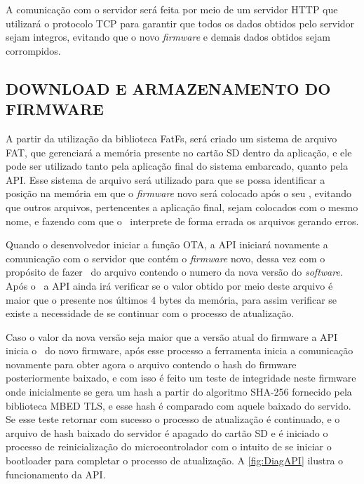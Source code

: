 A comunicação com o servidor será feita por meio de um servidor HTTP que utilizará o protocolo TCP para garantir que todos os dados obtidos pelo servidor sejam integros, evitando que o novo \textit{firmware} e demais dados obtidos sejam corrompidos. 


\subsection{DOWNLOAD E ARMAZENAMENTO DO FIRMWARE}

A partir da utilização da biblioteca FatFs, será criado um sistema de arquivo FAT, que gerenciará a memória presente no cartão SD dentro da aplicação, e ele pode ser utilizado tanto pela aplicação final do sistema embarcado, quanto pela API. Esse sistema de arquivo será utilizado para que se possa identificar a posição na memória em que o \textit{firmware} novo será colocado após o seu \download, evitando que outros arquivos, pertencentes a aplicação final, sejam colocados com o mesmo nome, e fazendo com que o \bootloader\ interprete de forma errada os arquivos gerando erros.

Quando o desenvolvedor iniciar a função OTA, a API iniciará novamente a comunicação com o servidor que contém o \textit{firmware} novo, dessa vez com o propósito de fazer \download\ do arquivo contendo o numero da nova versão do \textit{software}. Após o \download\ a API ainda irá verificar se o valor obtido por meio deste arquivo é maior que o presente nos últimos 4 bytes da memória, para assim verificar se existe a necessidade de se continuar com o processo de atualização. 

Caso o valor da nova versão seja maior que a versão atual do firmware a API inicia o \download\ do novo firmware, após esse processo a ferramenta inicia a comunicação novamente para obter agora o arquivo contendo o hash do firmware posteriormente baixado, e com isso é feito um teste de integridade neste firmware onde inicialmente se gera um hash a partir do algoritmo SHA-256 fornecido pela biblioteca MBED TLS, e esse hash é comparado com aquele baixado do servido. Se esse teste retornar com sucesso o processo de atualização é continuado, e o arquivo de hash baixado do servidor é apagado do cartão SD e é iniciado o processo de reinicialização do microcontrolador com o intuito de se iniciar o bootloader para completar o processo de atualização.
A \autoref{fig:DiagAPI} ilustra o funcionamento da API.

